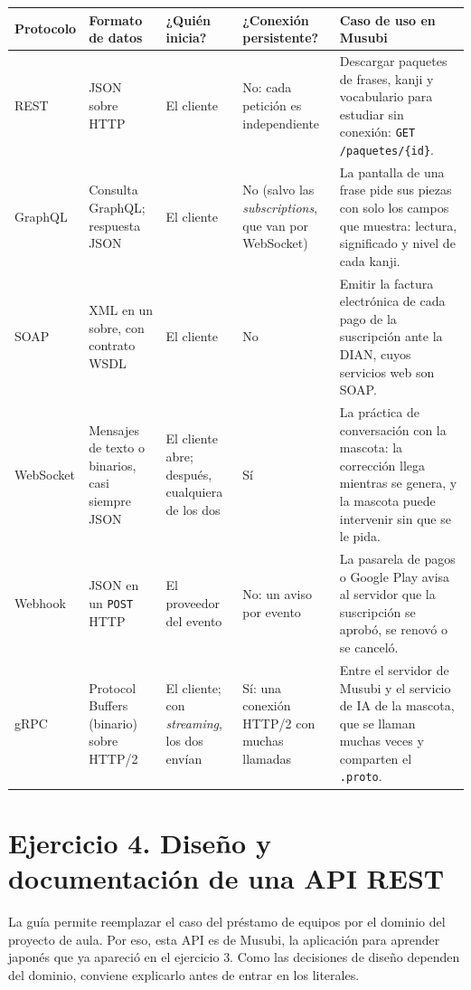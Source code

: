 \documentclass[11pt]{article}
\begin{document}
\begin{center}
\small
\renewcommand{\arraystretch}{1.35}
\begin{tabular}{@{}>{\raggedright\arraybackslash}p{1.7cm}>{\raggedright\arraybackslash}p{2.6cm}>{\raggedright\arraybackslash}p{2.4cm}>{\raggedright\arraybackslash}p{2.6cm}>{\raggedright\arraybackslash}p{5.6cm}@{}}
\hline
Protocolo & Formato de datos & ¿Quién inicia? & ¿Conexión persistente? & Caso de uso en Musubi \\
\hline
REST & JSON sobre HTTP & El cliente & No: cada petición es independiente & Descargar paquetes de frases, kanji y vocabulario para estudiar sin conexión: \texttt{GET /paquetes/\{id\}}. \\
GraphQL & Consulta GraphQL; respuesta JSON & El cliente & No (salvo las \emph{subscriptions}, que van por WebSocket) & La pantalla de una frase pide sus piezas con solo los campos que muestra: lectura, significado y nivel de cada kanji. \\
SOAP & XML en un sobre, con contrato WSDL & El cliente & No & Emitir la factura electrónica de cada pago de la suscripción ante la DIAN, cuyos servicios web son SOAP. \\
WebSocket & Mensajes de texto o binarios, casi siempre JSON & El cliente abre; después, cualquiera de los dos & Sí & La práctica de conversación con la mascota: la corrección llega mientras se genera, y la mascota puede intervenir sin que se le pida. \\
Webhook & JSON en un \texttt{POST} HTTP & El proveedor del evento & No: un aviso por evento & La pasarela de pagos o Google Play avisa al servidor que la suscripción se aprobó, se renovó o se canceló. \\
gRPC & Protocol Buffers (binario) sobre HTTP/2 & El cliente; con \emph{streaming}, los dos envían & Sí: una conexión HTTP/2 con muchas llamadas & Entre el servidor de Musubi y el servicio de IA de la mascota, que se llaman muchas veces y comparten el \texttt{.proto}. \\
\hline
\end{tabular}
\end{center}

\section*{Ejercicio 4. Diseño y documentación de una API REST}

La guía permite reemplazar el caso del préstamo de equipos por el dominio del proyecto de aula. Por eso, esta API es de Musubi, la aplicación para aprender japonés que ya apareció en el ejercicio 3. Como las decisiones de diseño dependen del dominio, conviene explicarlo antes de entrar en los literales.
\end{document}
